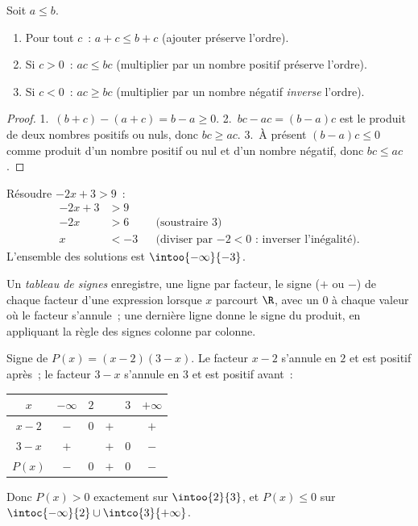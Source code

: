 \begin{proposition}\label{prop:g10:algebra:ineqrules}
Soit $a \leq b$.
\begin{enumerate}
  \item Pour tout $c$~: $a + c \leq b + c$ (ajouter préserve l'ordre).
  \item Si $c > 0$~: $ac \leq bc$ (multiplier par un nombre positif
        préserve l'ordre).
  \item Si $c < 0$~: $ac \geq bc$ (multiplier par un nombre négatif
        \emph{inverse} l'ordre).
\end{enumerate}
\end{proposition}

\begin{proof}
1.~$(b + c) - (a + c) = b - a \geq 0$.
2.~$bc - ac = (b-a)c$ est le produit de deux nombres positifs ou nuls,
donc $bc \geq ac$.
3.~À présent $(b-a)c \leq 0$ comme produit d'un nombre positif ou nul et
d'un nombre négatif, donc $bc \leq ac$.
\end{proof}

\begin{example}\label{ex:g10:algebra:firstineq}
Résoudre $-2x + 3 > 9$~:
\begin{align*}
-2x + 3 &> 9 \\
-2x &> 6 && \text{(soustraire $3$)} \\
x &< -3 && \text{(diviser par $-2 < 0$~: inverser l'inégalité).}
\end{align*}
L'ensemble des solutions est $\intoo{-\infty}{-3}$.
\end{example}

\begin{definition}\label{def:g10:algebra:signtable}
Un \emph{tableau de signes} enregistre, une
ligne par facteur, le signe ($+$ ou $-$) de chaque facteur d'une
expression lorsque $x$ parcourt $\R$, avec un $0$ à chaque valeur où le
facteur s'annule~; une dernière ligne donne le signe du produit, en
appliquant la règle des signes colonne par colonne.
\end{definition}

\begin{example}\label{ex:g10:algebra:signtable}
Signe de $P(x) = (x - 2)(3 - x)$. Le facteur $x - 2$ s'annule en $2$ et
est positif après~; le facteur $3 - x$ s'annule en $3$ et est positif
avant~:
\begin{center}
\renewcommand{\arraystretch}{1.3}
\begin{tabular}{c|ccccc}
$x$ & $-\infty$ \quad & $2$ & & $3$ & \quad $+\infty$ \\
\hline
$x - 2$ & $-$ & $0$ & $+$ & & $+$ \\
$3 - x$ & $+$ & & $+$ & $0$ & $-$ \\
\hline
$P(x)$ & $-$ & $0$ & $+$ & $0$ & $-$ \\
\end{tabular}
\end{center}
Donc $P(x) > 0$ exactement sur $\intoo{2}{3}$, et $P(x) \leq 0$ sur
$\intoc{-\infty}{2} \cup \intco{3}{+\infty}$.
\end{example}

